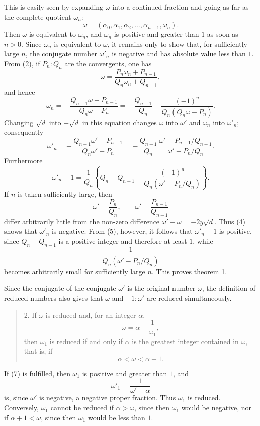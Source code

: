 \documentclass[11pt]{article}
\begin{document}
This is easily seen by expanding $\omega$ into a continued fraction and going as far as the complete quotient $\omega_n$:
\[
\tag{2}        \omega=(\alpha_0,\alpha_1,\alpha_2,\ldots,\alpha_{n-1},\omega_n).
\]
Then $\omega$ is equivalent to $\omega_n$, and $\omega_n$ is positive and greater than $1$ as soon as $n>0$. Since $\omega_n$ is equivalent to $\omega$, it remains only to show that, for sufficiently large $n$, the conjugate number $\omega'_n$ is negative and has absolute value less than $1$. From (2), if $P_n:Q_n$ are the convergents, one has
\[
        \omega=\frac{P_n\omega_n+P_{n-1}}{Q_n\omega_n+Q_{n-1}},
\]
and hence
\[
\tag{3}        \omega_n
=-\,\frac{Q_{n-1}\omega-P_{n-1}}{Q_n\omega-P_n}
=-\,\frac{Q_{n-1}}{Q_n}
-\frac{(-1)^n}{Q_n(Q_n\omega-P_n)}.
\]
Changing $\sqrt d$ into $-\sqrt d$ in this equation changes $\omega$ into $\omega'$ and $\omega_n$ into $\omega'_n$; consequently
\[
\tag{4}        \omega'_n
=-\,\frac{Q_{n-1}\omega'-P_{n-1}}{Q_n\omega'-P_n}
=-\,\frac{Q_{n-1}}{Q_n}\,
\frac{\omega'-P_{n-1}/Q_{n-1}}{\omega'-P_n/Q_n}.
\]
Furthermore
\[
\tag{5}        \omega'_n+1=
\frac1{Q_n}\left\{Q_n-Q_{n-1}
-\frac{(-1)^n}{Q_n\left(\omega'-P_n/Q_n\right)}\right\}.
\]
If $n$ is taken sufficiently large, then
\[
        \omega'-\frac{P_n}{Q_n},\qquad
        \omega'-\frac{P_{n-1}}{Q_{n-1}}
\]
differ arbitrarily little from the non-zero difference $\omega'-\omega=-2y\sqrt d$. Thus (4) shows that $\omega'_n$ is negative. From (5), however, it follows that $\omega'_n+1$ is positive, since $Q_n-Q_{n-1}$ is a positive integer and therefore at least $1$, while
\[
        \frac1{Q_n(\omega'-P_n/Q_n)}
\]
becomes arbitrarily small for sufficiently large $n$. This proves theorem 1.

Since the conjugate of the conjugate $\omega'$ is the original number $\omega$, the definition of reduced numbers also gives that $\omega$ and $-1:\omega'$ are reduced simultaneously.

\begin{quote}
2. If $\omega$ is reduced and, for an integer $\alpha$,
\[
\tag{6}        \omega=\alpha+\frac1{\omega_1},
\]
then $\omega_1$ is reduced if and only if $\alpha$ is the greatest integer contained in $\omega$, that is, if
\[
\tag{7}        \alpha<\omega<\alpha+1.
\]
\end{quote}

If (7) is fulfilled, then $\omega_1$ is positive and greater than $1$, and
\[
\tag{8}        \omega'_1=\frac1{\omega'-\alpha}
\]
is, since $\omega'$ is negative, a negative proper fraction. Thus $\omega_1$ is reduced. Conversely, $\omega_1$ cannot be reduced if $\alpha>\omega$, since then $\omega_1$ would be negative, nor if $\alpha+1<\omega$, since then $\omega_1$ would be less than $1$.
\end{document}
